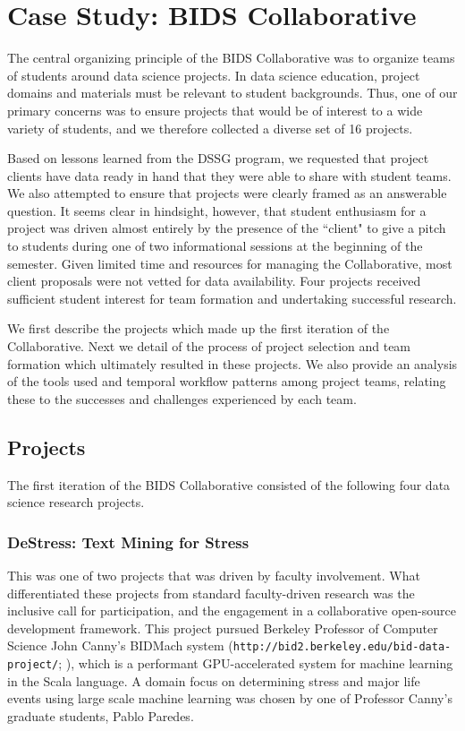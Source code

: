 \documentclass[12pt]{article}
\begin{document}
\section{Case Study: BIDS Collaborative}

The central organizing principle of the BIDS Collaborative was to organize teams of students around data science projects. In data science education, project domains and materials must be relevant to student backgrounds. Thus, one of our primary concerns was to ensure projects that would be of interest to a wide variety of students, and we therefore collected a diverse set of 16 projects. 

Based on lessons learned from the DSSG program, we requested that project clients have data ready in hand that they were able to share with student teams. We also attempted to ensure that projects were clearly framed as an answerable question. It seems clear in hindsight, however, that student enthusiasm for a project was driven almost entirely by the presence of the ``client" to give a pitch to students during one of two informational sessions at the beginning of the semester. Given limited time and resources for managing the Collaborative, most client proposals were not vetted for data availability. Four projects received sufficient student interest for team formation and undertaking successful research.

We first describe the projects which made up the first iteration of the Collaborative.  Next we detail of the process of project selection and team formation which ultimately resulted in these projects.  We also provide an analysis of the tools used and temporal workflow patterns among project teams, relating these to the successes and challenges experienced by each team.

\subsection{Projects}

The first iteration of the BIDS Collaborative consisted of the following four data science research projects.

\subsubsection*{DeStress: Text Mining for Stress}

This was one of two projects that was driven by faculty involvement. What differentiated these projects from standard faculty-driven research was the inclusive call for participation, and the engagement in a collaborative open-source development framework. This project pursued Berkeley Professor of Computer Science John Canny's BIDMach system (\texttt{http://bid2.berkeley.edu/bid-data-project/}; \cite{canny2013bidmach}), which is a performant GPU-accelerated system for machine learning in the Scala language. A domain focus on determining stress and major life events using large scale machine learning was chosen by one of Professor Canny's graduate students, Pablo Paredes.
\end{document}

